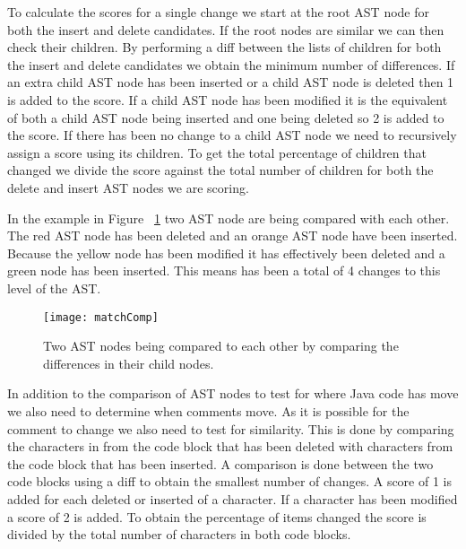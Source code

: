 To calculate the scores for a single change we start at the root AST node for both the insert and delete candidates.  If the root nodes are similar we can then check their children. By performing a diff between the lists of children for both the insert and delete candidates we obtain the minimum number of differences.  If an extra child AST node has been inserted or a child AST node is deleted then 1 is added to the score. If a child AST node has been modified it is the equivalent of both a child AST node being inserted and one being deleted so 2 is added to the score. If there has been no change to a child AST node we need to recursively assign a score using its children. To get the total percentage of children that changed we divide the score against the total number of children for both the delete and insert AST nodes we are scoring.

In the example in Figure ~\ref{fig:matchComp} two AST node are being compared with each other. The red AST node has been deleted and an orange AST node have been inserted. Because the yellow node has been modified it has effectively been deleted and a green node has been inserted. This means has been a total of 4 changes to this level of the AST. 

\begin{figure}[!t]
 \begin{center}
 \texttt{[image: matchComp]}
 \end{center}
 \caption{Two AST nodes being compared to each other by comparing the differences in their child nodes.}
 \label{fig:matchComp}
\end{figure}

In addition to the comparison of AST nodes to test for where Java code has move we also need to determine when comments move.  As it is possible for the comment to change we also need to test for similarity.  This is done by comparing the characters in from the code block that has been deleted with characters from the code block that has been inserted.  A comparison is done between the two code blocks using a diff to obtain the smallest number of changes. A score of 1 is added for each deleted or inserted of a character.  If a character has been modified a score of 2 is added. To obtain the percentage of items changed the score is divided by the total number of characters in both code blocks.

